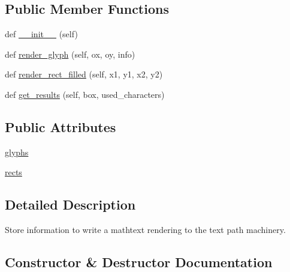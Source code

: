 \subsection*{Public Member Functions}
\begin{DoxyCompactItemize}
\item 
def \hyperlink{classmatplotlib_1_1mathtext_1_1MathtextBackendPath_a6031725f8039b0a74e824e6624310479}{\+\_\+\+\_\+init\+\_\+\+\_\+} (self)
\item 
def \hyperlink{classmatplotlib_1_1mathtext_1_1MathtextBackendPath_ad8a1e858e10411641179162cd7421fba}{render\+\_\+glyph} (self, ox, oy, info)
\item 
def \hyperlink{classmatplotlib_1_1mathtext_1_1MathtextBackendPath_a8e1c573a4654f7367d2ded3e70c367ca}{render\+\_\+rect\+\_\+filled} (self, x1, y1, x2, y2)
\item 
def \hyperlink{classmatplotlib_1_1mathtext_1_1MathtextBackendPath_a095bc36e36c08c56d1ca7f841cb23b42}{get\+\_\+results} (self, box, used\+\_\+characters)
\end{DoxyCompactItemize}
\subsection*{Public Attributes}
\begin{DoxyCompactItemize}
\item 
\hyperlink{classmatplotlib_1_1mathtext_1_1MathtextBackendPath_ab121826b9850757817d17ffa50b54e15}{glyphs}
\item 
\hyperlink{classmatplotlib_1_1mathtext_1_1MathtextBackendPath_aa7087987a9dda91a60a66d80a85f79cd}{rects}
\end{DoxyCompactItemize}


\subsection{Detailed Description}
\begin{DoxyVerb}Store information to write a mathtext rendering to the text path
machinery.
\end{DoxyVerb}
 

\subsection{Constructor \& Destructor Documentation}
\mbox{\label{classmatplotlib_1_1mathtext_1_1MathtextBackendPath_a6031725f8039b0a74e824e6624310479}} 
